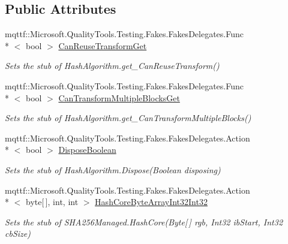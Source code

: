 \subsection*{Public Attributes}
\begin{DoxyCompactItemize}
\item 
mqttf\-::\-Microsoft.\-Quality\-Tools.\-Testing.\-Fakes.\-Fakes\-Delegates.\-Func\\*
$<$ bool $>$ \hyperlink{class_system_1_1_security_1_1_cryptography_1_1_fakes_1_1_stub_s_h_a256_managed_a90c9e81193c1386e30daa879a3e78d81}{Can\-Reuse\-Transform\-Get}
\begin{DoxyCompactList}\small\item\em Sets the stub of Hash\-Algorithm.\-get\-\_\-\-Can\-Reuse\-Transform()\end{DoxyCompactList}\item 
mqttf\-::\-Microsoft.\-Quality\-Tools.\-Testing.\-Fakes.\-Fakes\-Delegates.\-Func\\*
$<$ bool $>$ \hyperlink{class_system_1_1_security_1_1_cryptography_1_1_fakes_1_1_stub_s_h_a256_managed_ac4f0504fdef7ff4f51b95f0d2c51efb8}{Can\-Transform\-Multiple\-Blocks\-Get}
\begin{DoxyCompactList}\small\item\em Sets the stub of Hash\-Algorithm.\-get\-\_\-\-Can\-Transform\-Multiple\-Blocks()\end{DoxyCompactList}\item 
mqttf\-::\-Microsoft.\-Quality\-Tools.\-Testing.\-Fakes.\-Fakes\-Delegates.\-Action\\*
$<$ bool $>$ \hyperlink{class_system_1_1_security_1_1_cryptography_1_1_fakes_1_1_stub_s_h_a256_managed_a542376bb4605c209a806a9ff75d385af}{Dispose\-Boolean}
\begin{DoxyCompactList}\small\item\em Sets the stub of Hash\-Algorithm.\-Dispose(\-Boolean disposing)\end{DoxyCompactList}\item 
mqttf\-::\-Microsoft.\-Quality\-Tools.\-Testing.\-Fakes.\-Fakes\-Delegates.\-Action\\*
$<$ byte\mbox{[}$\,$\mbox{]}, int, int $>$ \hyperlink{class_system_1_1_security_1_1_cryptography_1_1_fakes_1_1_stub_s_h_a256_managed_a364cdcecb12ebf7f14faf3ea92fb19b0}{Hash\-Core\-Byte\-Array\-Int32\-Int32}
\begin{DoxyCompactList}\small\item\em Sets the stub of S\-H\-A256\-Managed.\-Hash\-Core(\-Byte\mbox{[}$\,$\mbox{]} rgb, Int32 ib\-Start, Int32 cb\-Size)\end{DoxyCompactList}\item 

\end{DoxyCompactItemize}
